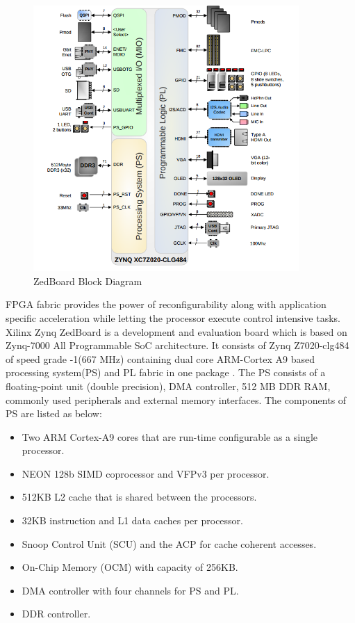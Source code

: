 \begin{figure}
	\centering
	\includegraphics[width=0.9\textwidth]{images/zedboard_block.png}
	\caption{ZedBoard Block Diagram\cite{11}}
	\label{zed:blk}
\end{figure}

FPGA fabric provides the power of reconfigurability along with application specific acceleration while letting the processor execute control intensive tasks. Xilinx Zynq ZedBoard is a development and evaluation board which is based on Zynq-7000 All Programmable SoC architecture. It consists of Zynq Z7020-clg484 of speed grade -1(667 MHz) containing dual core ARM-Cortex A9 based processing system(PS) and PL fabric in one package \cite{12}. The PS consists of a floating-point unit (double precision), DMA controller, 512 MB DDR RAM, commonly used peripherals and external memory interfaces. The components of PS are listed as below:


\begin{itemize}
	\item Two ARM Cortex-A9 cores that are run-time configurable as a single processor.
	\item NEON 128b SIMD coprocessor and VFPv3 per processor.
	\item 512KB L2 cache that is shared between the processors.
	\item 32KB instruction and L1 data caches per processor.
	\item Snoop Control Unit (SCU) and the ACP for cache coherent accesses.
	\item On-Chip Memory (OCM) with capacity of 256KB.
	\item DMA controller with four channels for PS and PL.
	\item DDR controller.
	\end{itemize}

